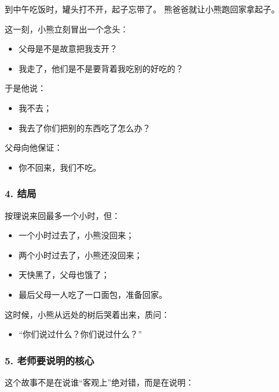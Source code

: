 \documentclass[
  chinese,
  9pt,
  a4paper,
]{ctexart}
\providecommand{\tightlist}{%
  \setlength{\itemsep}{0pt}\setlength{\parskip}{0pt}}
\begin{document}
到中午吃饭时，罐头打不开，起子忘带了。 熊爸爸就让小熊跑回家拿起子。

这一刻，小熊立刻冒出一个念头：

\begin{itemize}
\tightlist
\item
  父母是不是故意把我支开？
\item
  我走了，他们是不是要背着我吃别的好吃的？
\end{itemize}

于是他说：

\begin{itemize}
\tightlist
\item
  我不去；
\item
  我去了你们把别的东西吃了怎么办？
\end{itemize}

父母向他保证：

\begin{itemize}
\tightlist
\item
  你不回来，我们不吃。
\end{itemize}

\subsubsection{4. 结局}\label{ux7ed3ux5c40-1}

按理说来回最多一个小时，但：

\begin{itemize}
\tightlist
\item
  一个小时过去了，小熊没回来；
\item
  两个小时过去了，小熊还没回来；
\item
  天快黑了，父母也饿了；
\item
  最后父母一人吃了一口面包，准备回家。
\end{itemize}

这时候，小熊从远处的树后哭着出来，质问：

\begin{itemize}
\tightlist
\item
  ``你们说过什么？你们说过什么？''
\end{itemize}

\subsubsection{5.
老师要说明的核心}\label{ux8001ux5e08ux8981ux8bf4ux660eux7684ux6838ux5fc3}

这个故事不是在说谁``客观上''绝对错，而是在说明：
\end{document}
